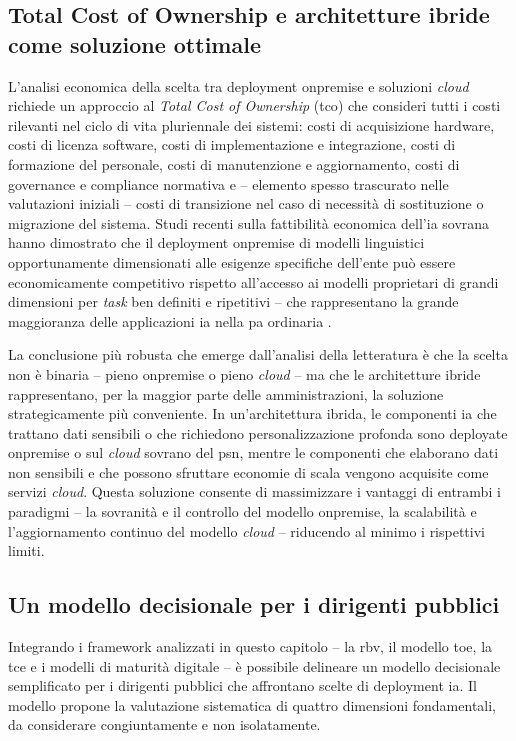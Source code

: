 \subsection{Total Cost of Ownership e architetture ibride come soluzione ottimale}

L'analisi economica della scelta tra deployment \gls{onpremise} e soluzioni \textit{cloud} richiede un approccio al \textit{Total Cost of Ownership} (\gls{tco}) che consideri tutti i costi rilevanti nel ciclo di vita pluriennale dei sistemi: costi di acquisizione hardware, costi di licenza software, costi di implementazione e integrazione, costi di formazione del personale, costi di manutenzione e aggiornamento, costi di governance e compliance normativa e -- elemento spesso trascurato nelle valutazioni iniziali -- costi di transizione nel caso di necessità di sostituzione o migrazione del sistema. Studi recenti sulla fattibilità economica dell'\gls{ia} sovrana hanno dimostrato che il deployment \gls{onpremise} di modelli linguistici opportunamente dimensionati alle esigenze specifiche dell'ente può essere economicamente competitivo rispetto all'accesso ai modelli proprietari di grandi dimensioni per \textit{task} ben definiti e ripetitivi -- che rappresentano la grande maggioranza delle applicazioni \gls{ia} nella \gls{pa} ordinaria \parencite{ProgrammaStrategicoIA}.

La conclusione più robusta che emerge dall'analisi della letteratura è che la scelta non è binaria -- pieno \gls{onpremise} o pieno \textit{cloud} -- ma che le architetture ibride rappresentano, per la maggior parte delle amministrazioni, la soluzione strategicamente più conveniente. In un'architettura ibrida, le componenti \gls{ia} che trattano dati sensibili o che richiedono personalizzazione profonda sono deployate \gls{onpremise} o sul \textit{cloud} sovrano del \gls{psn}, mentre le componenti che elaborano dati non sensibili e che possono sfruttare economie di scala vengono acquisite come servizi \textit{cloud}. Questa soluzione consente di massimizzare i vantaggi di entrambi i paradigmi -- la sovranità e il controllo del modello \gls{onpremise}, la scalabilità e l'aggiornamento continuo del modello \textit{cloud} -- riducendo al minimo i rispettivi limiti.

\subsection{Un modello decisionale per i dirigenti pubblici}

Integrando i framework analizzati in questo capitolo -- la \gls{rbv}, il modello \gls{toe}, la \gls{tce} e i modelli di maturità digitale -- è possibile delineare un modello decisionale semplificato per i dirigenti pubblici che affrontano scelte di deployment \gls{ia}. Il modello propone la valutazione sistematica di quattro dimensioni fondamentali, da considerare congiuntamente e non isolatamente.

